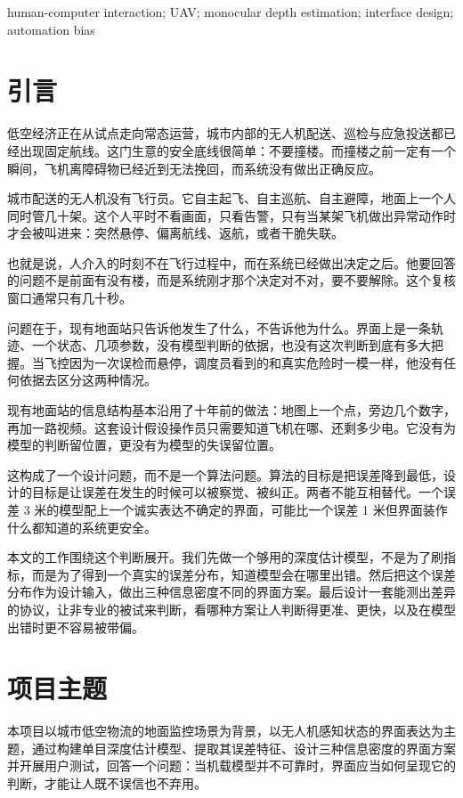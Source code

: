\documentclass[12pt,a4paper]{ctexart}
\begin{document}
\vspace{0.3cm}
 human-computer interaction; UAV; monocular depth estimation; interface design; automation bias

\newpage

\section{引言}

低空经济正在从试点走向常态运营，城市内部的无人机配送、巡检与应急投送都已经出现固定航线。这门生意的安全底线很简单：不要撞楼。而撞楼之前一定有一个瞬间，飞机离障碍物已经近到无法挽回，而系统没有做出正确反应。

城市配送的无人机没有飞行员。它自主起飞、自主巡航、自主避障，地面上一个人同时管几十架。这个人平时不看画面，只看告警，只有当某架飞机做出异常动作时才会被叫进来：突然悬停、偏离航线、返航，或者干脆失联。

也就是说，人介入的时刻不在飞行过程中，而在系统已经做出决定之后。他要回答的问题不是前面有没有楼，而是系统刚才那个决定对不对，要不要解除。这个复核窗口通常只有几十秒。

问题在于，现有地面站只告诉他发生了什么，不告诉他为什么。界面上是一条轨迹、一个状态、几项参数，没有模型判断的依据，也没有这次判断到底有多大把握。当飞控因为一次误检而悬停，调度员看到的和真实危险时一模一样，他没有任何依据去区分这两种情况。

现有地面站的信息结构基本沿用了十年前的做法：地图上一个点，旁边几个数字，再加一路视频。这套设计假设操作员只需要知道飞机在哪、还剩多少电。它没有为模型的判断留位置，更没有为模型的失误留位置。

这构成了一个设计问题，而不是一个算法问题。算法的目标是把误差降到最低，设计的目标是让误差在发生的时候可以被察觉、被纠正。两者不能互相替代。一个误差 3 米的模型配上一个诚实表达不确定的界面，可能比一个误差 1 米但界面装作什么都知道的系统更安全。

本文的工作围绕这个判断展开。我们先做一个够用的深度估计模型，不是为了刷指标，而是为了得到一个真实的误差分布，知道模型会在哪里出错。然后把这个误差分布作为设计输入，做出三种信息密度不同的界面方案。最后设计一套能测出差异的协议，让非专业的被试来判断，看哪种方案让人判断得更准、更快，以及在模型出错时更不容易被带偏。

\section{项目主题}

本项目以城市低空物流的地面监控场景为背景，以无人机感知状态的界面表达为主题，通过构建单目深度估计模型、提取其误差特征、设计三种信息密度的界面方案并开展用户测试，回答一个问题：当机载模型并不可靠时，界面应当如何呈现它的判断，才能让人既不误信也不弃用。
\end{document}
